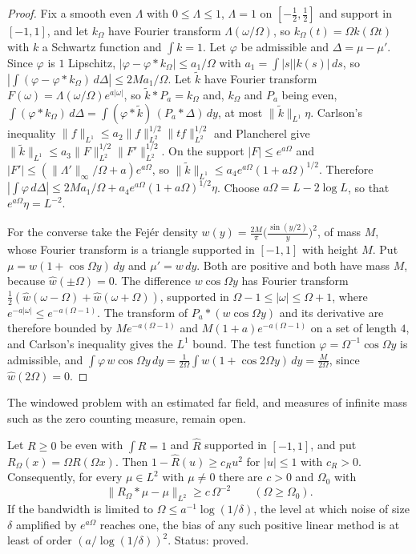 \begin{proof}
Fix a smooth even $\Lambda$ with $0\le\Lambda\le1$, $\Lambda=1$ on $[-\tfrac12,\tfrac12]$ and support in $[-1,1]$, and let $k_\Omega$ have Fourier transform $\Lambda(\omega/\Omega)$, so $k_\Omega(t)=\Omega k(\Omega t)$ with $k$ a Schwartz function and $\int k=1$. Let $\varphi$ be admissible and $\Delta=\mu-\mu'$. Since $\varphi$ is $1$ Lipschitz, $|\varphi-\varphi*k_\Omega|\le a_1/\Omega$ with $a_1=\int|s||k(s)|\,ds$, so $|\int(\varphi-\varphi*k_\Omega)\,d\Delta|\le2Ma_1/\Omega$. Let $\tilde k$ have Fourier transform $F(\omega)=\Lambda(\omega/\Omega)e^{a|\omega|}$, so $\tilde k*P_a=k_\Omega$ and, $k_\Omega$ and $P_a$ being even, $\int(\varphi*k_\Omega)\,d\Delta=\int(\varphi*\tilde k)\,(P_a*\Delta)\,dy$, at most $\|\tilde k\|_{L^1}\eta$. Carlson's inequality $\|f\|_{L^1}\le a_2\|f\|_{L^2}^{1/2}\|tf\|_{L^2}^{1/2}$ and Plancherel give $\|\tilde k\|_{L^1}\le a_3\|F\|_{L^2}^{1/2}\|F'\|_{L^2}^{1/2}$. On the support $|F|\le e^{a\Omega}$ and $|F'|\le(\|\Lambda'\|_\infty/\Omega+a)e^{a\Omega}$, so $\|\tilde k\|_{L^1}\le a_4e^{a\Omega}(1+a\Omega)^{1/2}$. Therefore $|\int\varphi\,d\Delta|\le2Ma_1/\Omega+a_4e^{a\Omega}(1+a\Omega)^{1/2}\eta$. Choose $a\Omega=L-2\log L$, so that $e^{a\Omega}\eta=L^{-2}$.

For the converse take the Fej\'er density $w(y)=\frac{2M}\pi\bigl(\frac{\sin(y/2)}y\bigr)^2$, of mass $M$, whose Fourier transform is a triangle supported in $[-1,1]$ with height $M$. Put $\mu=w(1+\cos\Omega y)\,dy$ and $\mu'=w\,dy$. Both are positive and both have mass $M$, because $\hat w(\pm\Omega)=0$. The difference $w\cos\Omega y$ has Fourier transform $\tfrac12(\hat w(\omega-\Omega)+\hat w(\omega+\Omega))$, supported in $\Omega-1\le|\omega|\le\Omega+1$, where $e^{-a|\omega|}\le e^{-a(\Omega-1)}$. The transform of $P_a*(w\cos\Omega y)$ and its derivative are therefore bounded by $Me^{-a(\Omega-1)}$ and $M(1+a)e^{-a(\Omega-1)}$ on a set of length $4$, and Carlson's inequality gives the $L^1$ bound. The test function $\varphi=\Omega^{-1}\cos\Omega y$ is admissible, and $\int\varphi\,w\cos\Omega y\,dy=\frac1{2\Omega}\int w(1+\cos2\Omega y)\,dy=\frac M{2\Omega}$, since $\hat w(2\Omega)=0$.
\end{proof}

The windowed problem with an estimated far field, and measures of infinite mass such as the zero counting measure, remain open.


\begin{proposition}\label{cd:prop:sat}
Let $R\ge0$ be even with $\int R=1$ and $\widehat R$ supported in $[-1,1]$, and put $R_\Omega(x)=\Omega R(\Omega x)$. Then $1-\widehat R(u)\ge c_Ru^2$ for $|u|\le1$ with $c_R>0$. Consequently, for every $\mu\in L^2$ with $\mu\ne0$ there are $c>0$ and $\Omega_0$ with
\[
\|R_\Omega*\mu-\mu\|_{L^2}\ge c\,\Omega^{-2}\qquad(\Omega\ge\Omega_0).
\]
If the bandwidth is limited to $\Omega\le a^{-1}\log(1/\delta)$, the level at which noise of size $\delta$ amplified by $e^{a\Omega}$ reaches one, the bias of any such positive linear method is at least of order $(a/\log(1/\delta))^2$. Status: proved.
\end{proposition}

